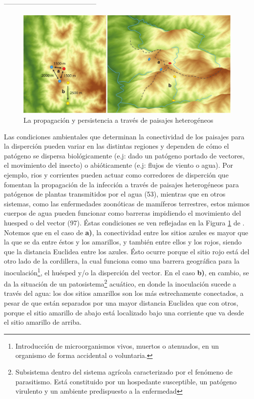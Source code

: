 -----------------------------------------
\begin{figure}
\centering%
\includegraphics[width=1\textwidth]{images/paisajes_heterogeneos}%
\caption{La propagación y persistencia a través de paisajes heterogéneos}\label{fig:paisajes_h}
\end{figure}


Las condiciones ambientales que determinan la conectividad de los paisajes
para la disperción pueden variar en las distintas regiones y dependen de cómo
el patógeno se dispersa biológicamente (e.j: dado un patógeno portado de
vectores, el movimiento del insecto) o abióticamente (e.j: flujos de viento o agua).
Por ejemplo, rios y corrientes pueden actuar como corredores de disperción que
fomentan la propagación de la infección a través de paisajes heterogéneos
para patógenos de plantas transmitidos por el agua (53), mientras que en otros
sistemas, como las enfermedades zoonóticas de mamíferos terrestres, estos mismos
cuerpos de agua pueden funcionar como barreras impidiendo el movimiento
del huesped o del vector (97). Éstas condiciones se ven reflejadas en la
Figura \ref{fig:paisajes_h} de \cite{Landscape Epidemiology of Emerging Infectious...}. Notemos que en el caso de \textbf{a)}, la
conectividad entre los sitios azules es mayor que la que se da entre éstos y
los amarillos, y también entre ellos y los rojos, siendo que la distancia
Euclidea entre los azules. Ésto ocurre porque el sitio rojo está del otro lado
de la cordillera, la cual funciona como una barrera geográfica para la
inoculación\footnote{Introducción de microorganismos vivos, muertos o atenuados,
en un organismo de forma accidental o voluntaria.}, el huésped y/o la disperción
del vector. En el caso \textbf{b)}, en cambio, se da la situación de un
patosistema\footnote{Subsistema dentro del sistema agrícola caracterizado por el
fenómeno de parasitismo. Está constituido por un hospedante susceptible,
un patógeno virulento y un ambiente predispuesto a la enfermedad} acuático, en
donde la inoculación sucede a través del agua: los dos sitios amarillos son los
más estrechamente conectados, a pesar de que están separados por una mayor
distancia Euclidea que con otros, porque el sitio amarillo de abajo está localizado
bajo una corriente que va desde el sitio amarillo de arriba.



